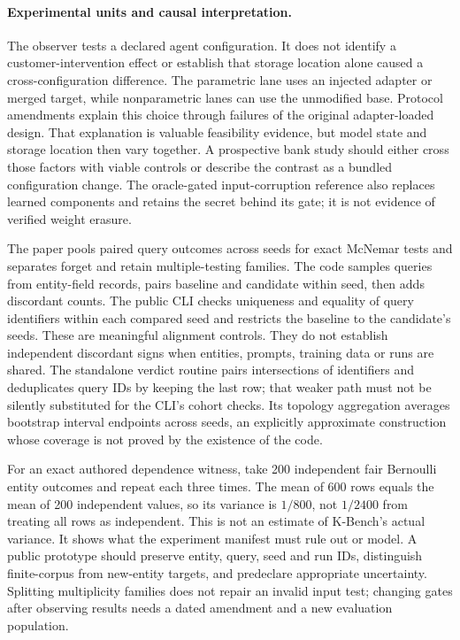 \paragraph{Experimental units and causal interpretation.}
The observer tests a declared agent configuration. It does not identify a
customer-intervention effect or establish that storage location alone caused
a cross-configuration difference. The parametric lane uses an injected adapter
or merged target, while nonparametric lanes can use the unmodified base.
Protocol amendments explain this choice through failures of the original
adapter-loaded design. That explanation is valuable feasibility evidence,
but model state and storage location then vary together. A prospective bank
study should either cross those factors with viable controls or describe the
contrast as a bundled configuration change. The oracle-gated input-corruption
reference also replaces learned components and retains the secret behind its
gate; it is not evidence of verified weight erasure.
\citep{exec24_unlearning_original,exec24_unlearning_software}

The paper pools paired query outcomes across seeds for exact McNemar tests and
separates forget and retain multiple-testing families. The code samples queries
from entity-field records, pairs baseline and candidate within seed, then adds
discordant counts. The public CLI checks uniqueness and equality of query
identifiers within each compared seed and restricts the baseline to the
candidate's seeds. These are meaningful alignment controls. They do not establish
independent discordant signs when entities, prompts, training data or runs are
shared. The standalone verdict routine pairs intersections of identifiers and
deduplicates query IDs by keeping the last row; that weaker path must not be
silently substituted for the CLI's cohort checks. Its topology aggregation
averages bootstrap interval endpoints across seeds, an explicitly approximate
construction whose coverage is not proved by the existence of the code.
\citep{exec24_unlearning_original,exec24_unlearning_software}

For an exact authored dependence witness, take 200 independent fair Bernoulli
entity outcomes and repeat each three times. The mean of 600 rows equals the
mean of 200 independent values, so its variance is $1/800$, not $1/2400$ from
treating all rows as independent. This is not an estimate of K-Bench's actual
variance. It shows what the experiment manifest must rule out or model. A public
prototype should preserve entity, query, seed and run IDs, distinguish
finite-corpus from new-entity targets, and predeclare appropriate uncertainty.
Splitting multiplicity families does not repair an invalid input test; changing
gates after observing results needs a dated amendment and a new evaluation
population.\citep{exec24_unlearning_reference,exec24_unlearning_software}

